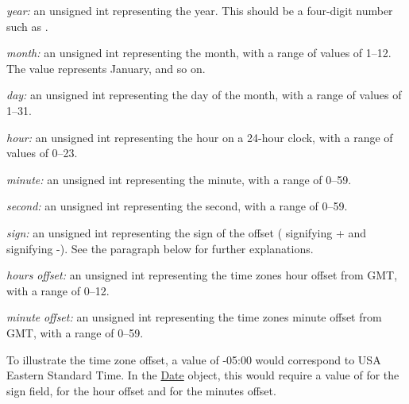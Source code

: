 \begin{DoxyItemize}
\item {\itshape year\+:} an unsigned int representing the year. This should be a four-\/digit number such as {}.\end{DoxyItemize}
\begin{DoxyItemize}
\item {\itshape month\+:} an unsigned int representing the month, with a range of values of 1--12. The value {} represents January, and so on.\end{DoxyItemize}
\begin{DoxyItemize}
\item {\itshape day\+:} an unsigned int representing the day of the month, with a range of values of 1--31.\end{DoxyItemize}
\begin{DoxyItemize}
\item {\itshape hour\+:} an unsigned int representing the hour on a 24-\/hour clock, with a range of values of 0--23.\end{DoxyItemize}
\begin{DoxyItemize}
\item {\itshape minute\+:} an unsigned int representing the minute, with a range of 0--59.\end{DoxyItemize}
\begin{DoxyItemize}
\item {\itshape second\+:} an unsigned int representing the second, with a range of 0--59.\end{DoxyItemize}
\begin{DoxyItemize}
\item {\itshape sign\+:} an unsigned int representing the sign of the offset ({} signifying {\ttfamily +} and {} signifying {\ttfamily -\/}). See the paragraph below for further explanations.\end{DoxyItemize}
\begin{DoxyItemize}
\item {\itshape hours} {\itshape offset\+:} an unsigned int representing the time zone\textquotesingle{}s hour offset from G\+MT, with a range of 0--12.\end{DoxyItemize}
\begin{DoxyItemize}
\item {\itshape minute} {\itshape offset\+:} an unsigned int representing the time zone\textquotesingle{}s minute offset from G\+MT, with a range of 0--59.\end{DoxyItemize}
To illustrate the time zone offset, a value of {\ttfamily -\/05\+:00} would correspond to U\+SA Eastern Standard Time. In the \hyperlink{class_date}{Date} object, this would require a value of {} for the sign field, {} for the hour offset and {} for the minutes offset.


